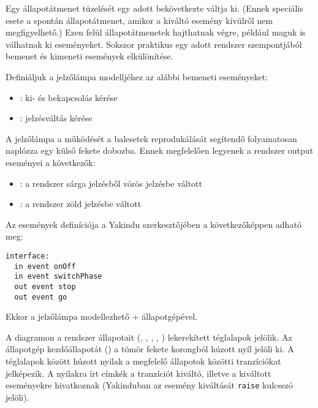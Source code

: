 Egy állapotátmenet tüzelését egy adott  bekövetkezte váltja ki. (Ennek speciális esete a spontán állapotátmenet, amikor a kiváltó esemény kívülről nem megfigyelhető.) Ezen felül állapotátmenetek  hajthatnak végre, például maguk is válhatnak ki eseményeket. Sokszor praktikus egy adott rendszer szempontjából bemenet és kimeneti események elkülönítése.

\begin{pelda}
Definiáljuk a jelzőlámpa modelljéhez az alábbi bemeneti eseményeket:

\begin{itemize}
	\item {}: ki- és bekapcsolás kérése
	\item {}: jelzésváltás kérése
\end{itemize}

A jelzőlámpa a működését a balesetek reprodukálását segítendő folyamatosan naplózza egy külső fekete dobozba. Ennek megfelelően legyenek a rendszer output eseményei a következők:

\begin{itemize}
	\item {}: a rendszer sárga jelzésből vörös jelzésbe váltott
	\item {}: a rendszer zöld jelzésbe váltott
\end{itemize}

Az események definíciója a Yakindu szerkesztőjében a következőképpen adható meg:

\begin{lstlisting}
interface:
  in event onOff
  in event switchPhase
  out event stop
  out event go
\end{lstlisting}

Ekkor a jelzőlámpa modellezhető \az+ állapotgépével.
\end{pelda}


A diagramon a rendszer állapotait (, , , , ) lekerekített téglalapok jelölik. Az állapotgép kezdőállapotát () a tömör fekete korongból húzott nyíl jelöli ki. A téglalapok között húzott nyilak a megfelelő állapotok közötti tranzíciókat jelképezik. A nyilakra írt címkék a tranzíciót kiváltó, illetve a kiváltott eseményekre hivatkoznak (Yakinduban az esemény kiváltását \lstinline{raise} kulcsszó jelöli).

